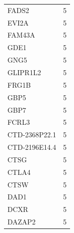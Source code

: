 \documentclass[a4paper,12pt]{article}
\begin{document}
\begin{longtable}{ll}
  FADS2         & 5                                                                                     \\
  EVI2A         & 5                                                                                     \\
  FAM43A        & 5                                                                                     \\
  GDE1          & 5                                                                                     \\
  GNG5          & 5                                                                                     \\
  GLIPR1L2      & 5                                                                                     \\
  FRG1B         & 5                                                                                     \\
  GBP5          & 5                                                                                     \\
  GBP7          & 5                                                                                     \\
  FCRL3         & 5                                                                                     \\
  CTD-2368P22.1 & 5                                                                                     \\
  CTD-2196E14.4 & 5                                                                                     \\
  CTSG          & 5                                                                                     \\
  CTLA4         & 5                                                                                     \\
  CTSW          & 5                                                                                     \\
  DAD1          & 5                                                                                     \\
  DCXR          & 5                                                                                     \\
  DAZAP2        & 5                                                                                     \\

\end{longtable}
\end{document}
